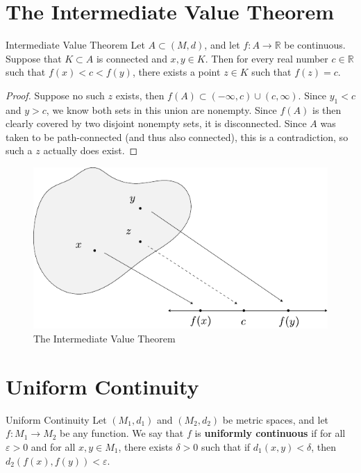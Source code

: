 \documentclass[10pt]{report}
\begin{document}

\section{The Intermediate Value Theorem}

\begin{thrm}{Intermediate Value Theorem}{}
	Let $A \subset (M,d)$, and let $f:A \to \mathbb{R}$ be continuous. Suppose that $K \subset A$ is connected and $x,y \in K$. Then for every real number $c \in \mathbb{R}$ such that $f(x) < c < f(y)$, there exists a point $z \in K$ such that $f(z) = c$.
\end{thrm}
\begin{proof}
	Suppose no such $z$ exists, then $f(A) \subset (-\infty,c) \cup (c, \infty)$. Since $y_1 < c$ and $y > c$, we know both sets in this union are nonempty. Since $f(A)$ is then clearly covered by two disjoint nonempty sets, it is disconnected. Since $A$ was taken to be path-connected (and thus also connected), this is a contradiction, so such a $z$ actually does exist.
\end{proof}

\begin{figure}[H]
	\centering
	\includegraphics[scale=0.8]{fig/intermediate-value.pdf}
	\caption{The Intermediate Value Theorem}
\end{figure}



\section{Uniform Continuity}
\begin{defn}{Uniform Continuity}{}
	Let $(M_1,d_1)$ and $(M_2,d_2)$ be metric spaces, and let $f:M_1 \to M_2$ be any function. We say that $f$ is \textbf{uniformly continuous} if for all $\varepsilon>0$ and for all $x,y \in M_1$, there exists $\delta>0$ such that if $d_1(x,y) < \delta$, then $d_2(f(x), f(y)) < \varepsilon$.
\end{defn}
\end{document}
